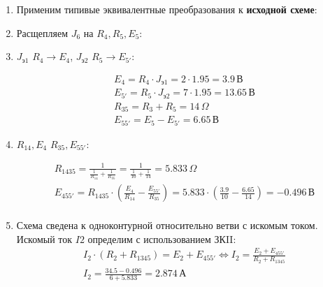 \begin{enumerate}
	\item Применим типивые эквивалентные преобразования к \textbf{исходной схеме}:
	      
	\item Расщепляем $J_6$ на $R_4, R_5, E_5$:
	      
	\item $J_{\text{э}1}$ \parallel $R_4 \rightarrow E_4$, $J_{\text{э}2}$ \parallel $R_5 \rightarrow E_{5'}$:
	      

	      \[
		      \begin{gathered}
			      E_4 = R_4 \cdot J_{\text{э1}} = 2 \cdot 1.95 = 3.9 \, \text{В} \\
			      E_{5'} = R_5 \cdot J_{\text{э2}} = 7 \cdot 1.95 = 13.65 \, \text{В} \\
			      R_{35} = R_3 + R_5 = 14 \, \Omega \\
			      E_{55'} = E_5 - E_{5'} = 6.65 \, \text{В}
		      \end{gathered}
	      \]
	\item $R_{14}, E_4$ \parallel $R_{35}, E_{55'}$:
	      

	      \[
		      \begin{gathered}
			      R_{1435} = \frac{1}{\frac{1}{R_{14}} + \frac{1}{R_{35}}} = \frac{1}{\frac{1}{10} + \frac{1}{14}} = 5.833 \, \Omega \\
			      E_{455'} = R_{1435} \cdot \left(\frac{E_4}{R_{14}} - \frac{E_{55'}}{R_{35}}\right) = 5.833 \cdot \left(\frac{3.9}{10} - \frac{6.65}{14}\right) = -0.496 \, \text{В} \\
		      \end{gathered}
	      \]
	\item Схема сведена к одноконтурной относительно ветви с искомым током. Искомый ток $I2$ определим с использованием ЗКII:
	      \[
		      \begin{gathered}
			      I_2 \cdot (R_2 + R_{1345}) = E_2 + E_{455'} \Leftrightarrow I_2 = \frac{E_2 + E_{455'}}{R_2 + R_{1345}} \\
			      I_2 = \frac{34.5 - 0.496}{6+5.833} = 2.874 \, \text{А}
		      \end{gathered}
	      \]

\end{enumerate}
